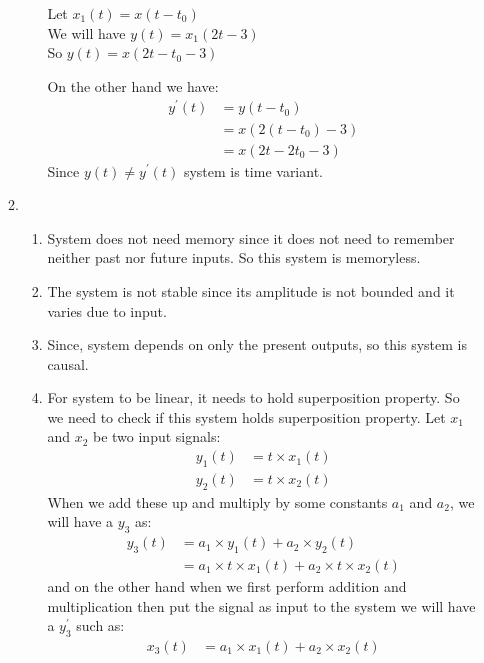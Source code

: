 \documentclass[10pt,a4paper, margin=1in]{article}
\begin{document}
\begin{enumerate}
\begin{enumerate}
\begin{enumerate}
        \begin{center}
        Let $x_1(t) = x(t-t_0)$ \\
        We will have $y(t)=x_1(2t-3)$ \\
        So $y(t) = x(2t-t_0-3)$
        \end{center}
        On the other hand we have:
        \begin{align*}
        y^{'}(t) &= y(t-t_0)  \\
                 &= x(2(t-t_0)-3)\\
                 &= x(2t-2t_0-3)
        \end{align*}
        Since $y(t) \neq y^{'}(t)$ system is time variant. \\
        \end{enumerate}
    \item
        \begin{enumerate}
        \item System does not need memory since it does not need to remember neither past nor future inputs. So this system is memoryless.
        \item The system is not stable since its amplitude is not bounded and it varies due to input.
        \item Since, system depends on only the present outputs, so this system is causal.
        \item For system to be linear, it needs to hold superposition property. So we need to check if this system holds superposition property. Let $x_1$ and $x_2$ be two input signals:
            \begin{align*}
            y_1(t) & =t \times x_1(t) \\
            y_2(t) & =t \times x_2(t)
            \end{align*}
            When we add these up and multiply by some constants $a_1$ and $a_2$, we will have a $y_3$ as:
            \begin{align*}
            y_3(t)&= a_1 \times y_1(t) + a_2 \times y_2(t) \\
                  &= a_1 \times t \times x_1(t)+ a_2 \times t \times x_2(t)
            \end{align*}
            and on the other hand when we first perform addition and multiplication then put the signal as input to the system we will have a $y_3^{'}$ such as:
            \begin{align*}
                x_3(t)&=a_1\times x_1(t) + a_2\times x_2(t) \\

\end{align*}
\end{enumerate}
\end{enumerate}
\end{enumerate}
\end{document}
